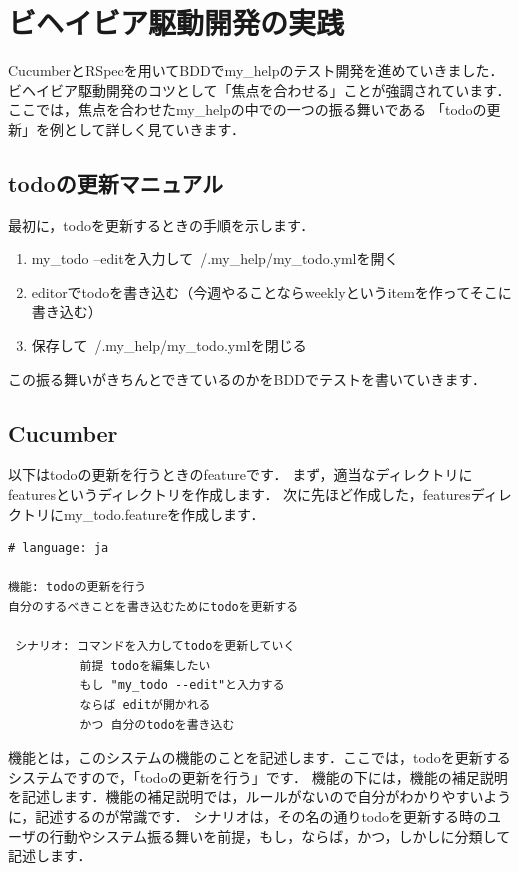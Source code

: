 
\section{ビヘイビア駆動開発の実践}
CucumberとRSpecを用いてBDDでmy\_helpのテスト開発を進めていきました．
ビヘイビア駆動開発のコツとして「焦点を合わせる」ことが強調されています．
ここでは，焦点を合わせたmy\_helpの中での一つの振る舞いである
「todoの更新」を例として詳しく見ていきます．

\subsection{todoの更新マニュアル}
最初に，todoを更新するときの手順を示します．

\begin{enumerate}
\item my\_todo --editを入力して~/.my\_help/my\_todo.ymlを開く
\item editorでtodoを書き込む（今週やることならweeklyというitemを作ってそこに書き込む）
\item 保存して~/.my\_help/my\_todo.ymlを閉じる
\end{enumerate}
この振る舞いがきちんとできているのかをBDDでテストを書いていきます．

\subsection{Cucumber}
以下はtodoの更新を行うときのfeatureです．
まず，適当なディレクトリにfeaturesというディレクトリを作成します．
次に先ほど作成した，featuresディレクトリにmy\_todo.featureを作成します．
\begin{lstlisting}[style=customCsh,basicstyle={\scriptsize\ttfamily}]
# language: ja 

機能: todoの更新を行う
自分のするべきことを書き込むためにtodoを更新する

 シナリオ: コマンドを入力してtodoを更新していく
          前提 todoを編集したい
          もし "my_todo --edit"と入力する
          ならば editが開かれる
          かつ 自分のtodoを書き込む
\end{lstlisting}
機能とは，このシステムの機能のことを記述します．ここでは，todoを更新するシステムですので，「todoの更新を行う」です．
機能の下には，機能の補足説明を記述します．機能の補足説明では，ルールがないので自分がわかりやすいように，記述するのが常識です．
シナリオは，その名の通りtodoを更新する時のユーザの行動やシステム振る舞いを前提，もし，ならば，かつ，しかしに分類して記述します．

